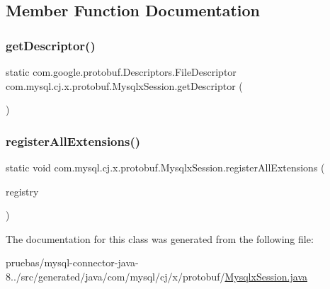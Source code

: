 \subsection{Member Function Documentation}
\mbox{\label{classcom_1_1mysql_1_1cj_1_1x_1_1protobuf_1_1_mysqlx_session_a96b1ed99c26853eaa3f4cf7fab4a9809}} 
\subsubsection{\texorpdfstring{get\+Descriptor()}{getDescriptor()}}
{\footnotesize\ttfamily static com.\+google.\+protobuf.\+Descriptors.\+File\+Descriptor com.\+mysql.\+cj.\+x.\+protobuf.\+Mysqlx\+Session.\+get\+Descriptor (\begin{DoxyParamCaption}{ }\end{DoxyParamCaption})\hspace{0.3cm}{\ttfamily [static]}}

\mbox{\label{classcom_1_1mysql_1_1cj_1_1x_1_1protobuf_1_1_mysqlx_session_af02253cfc5f4eb6de69b962eec9818a1}} 
\subsubsection{\texorpdfstring{register\+All\+Extensions()}{registerAllExtensions()}}
{\footnotesize\ttfamily static void com.\+mysql.\+cj.\+x.\+protobuf.\+Mysqlx\+Session.\+register\+All\+Extensions (\begin{DoxyParamCaption}\item[{com.\+google.\+protobuf.\+Extension\+Registry}]{registry }\end{DoxyParamCaption})\hspace{0.3cm}{\ttfamily [static]}}



The documentation for this class was generated from the following file\+:\begin{DoxyCompactItemize}
\item 
pruebas/mysql-\/connector-\/java-\/8../src/generated/java/com/mysql/cj/x/protobuf/\mbox{\hyperlink{generated_2java_2com_2mysql_2cj_2x_2protobuf_2_mysqlx_session_8java}{Mysqlx\+Session.\+java}}\end{DoxyCompactItemize}
